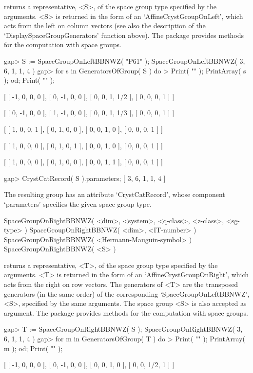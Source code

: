 returns a representative, <S>, of the space group type specified by 
the arguments. <S> is returned in the form of an `AffineCrystGroupOnLeft',
which acts from the left on column vectors (see also the description
of the `DisplaySpaceGroupGenerators' function above). The package
{\Cryst} provides methods for the computation with space groups.

\beginexample
gap> S := SpaceGroupOnLeftBBNWZ( "P61" );
SpaceGroupOnLeftBBNWZ( 3, 6, 1, 1, 4 )
gap> for s in GeneratorsOfGroup( S ) do
>  Print( "\n" ); PrintArray( s ); od; Print( "\n" );

[ [   -1,    0,    0,    0 ],
  [    0,   -1,    0,    0 ],
  [    0,    0,    1,  1/2 ],
  [    0,    0,    0,    1 ] ]

[ [    0,   -1,    0,    0 ],
  [    1,   -1,    0,    0 ],
  [    0,    0,    1,  1/3 ],
  [    0,    0,    0,    1 ] ]

[ [  1,  0,  0,  1 ],
  [  0,  1,  0,  0 ],
  [  0,  0,  1,  0 ],
  [  0,  0,  0,  1 ] ]

[ [  1,  0,  0,  0 ],
  [  0,  1,  0,  1 ],
  [  0,  0,  1,  0 ],
  [  0,  0,  0,  1 ] ]

[ [  1,  0,  0,  0 ],
  [  0,  1,  0,  0 ],
  [  0,  0,  1,  1 ],
  [  0,  0,  0,  1 ] ]

gap> CrystCatRecord( S ).parameters;
[ 3, 6, 1, 1, 4 ]
\endexample

The resulting group has an attribute `CrystCatRecord', whose component
`parameters' specifies the given space-group type.

\>SpaceGroupOnRightBBNWZ( <dim>, <system>, <q-class>, <z-class>, <sg-type> )
\>SpaceGroupOnRightBBNWZ( <dim>, <IT-number> )
\>SpaceGroupOnRightBBNWZ( <Hermann-Mauguin-symbol> )
\>SpaceGroupOnRightBBNWZ( <S> )

returns a representative, <T>, of the space group type specified by 
the arguments. <T> is returned in the form of an `AffineCrystGroupOnRight',
which acts from the right on row vectors. The generators of <T> are the 
transposed generators (in the same order) of the corresponding 
`SpaceGroupOnLeftBBNWZ', <S>, specified by the same arguments.
The space group <S> is also accepted as argument. The package
{\Cryst} provides methods for the computation with space groups.

\beginexample
gap> T := SpaceGroupOnRightBBNWZ( S );
SpaceGroupOnRightBBNWZ( 3, 6, 1, 1, 4 )
gap> for m in GeneratorsOfGroup( T ) do
>  Print( "\n" ); PrintArray( m ); od; Print( "\n" );
    
[ [   -1,    0,    0,    0 ],
  [    0,   -1,    0,    0 ],
  [    0,    0,    1,    0 ],
  [    0,    0,  1/2,    1 ] ]

